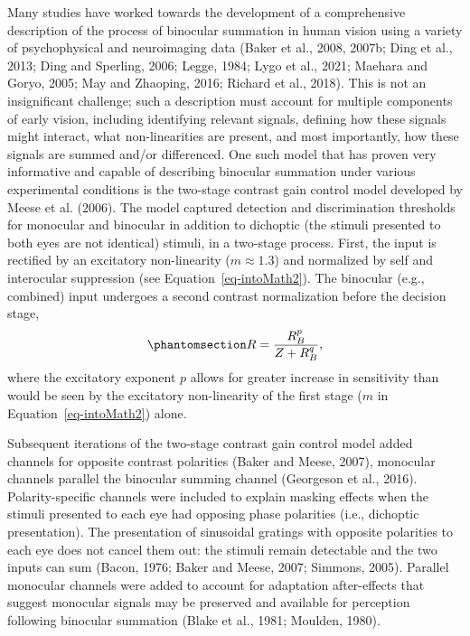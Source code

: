 \documentclass[
  12pt,
]{article}
\begin{document}
Many studies have worked towards the development of a comprehensive
description of the process of binocular summation in human vision using
a variety of psychophysical and neuroimaging data (Baker et al., 2008,
2007b; Ding et al., 2013; Ding and Sperling, 2006; Legge, 1984; Lygo et
al., 2021; Maehara and Goryo, 2005; May and Zhaoping, 2016; Richard et
al., 2018). This is not an insignificant challenge; such a description
must account for multiple components of early vision, including
identifying relevant signals, defining how these signals might interact,
what non-linearities are present, and most importantly, how these
signals are summed and/or differenced. One such model that has proven
very informative and capable of describing binocular summation under
various experimental conditions is the two-stage contrast gain control
model developed by Meese et al. (2006). The model captured detection and
discrimination thresholds for monocular and binocular in addition to
dichoptic (the stimuli presented to both eyes are not identical)
stimuli, in a two-stage process. First, the input is rectified by an
excitatory non-linearity (\(m \approx 1.3\)) and normalized by self and
interocular suppression (see Equation~\ref{eq-intoMath2}). The binocular
(e.g., combined) input undergoes a second contrast normalization before
the decision stage,
\begin{equation}\phantomsection\label{eq-IntroMathSecondStage}{
R = \frac{R_B^p}{Z + R_B^q},
}\end{equation} where the excitatory exponent \(p\) allows for greater
increase in sensitivity than would be seen by the excitatory
non-linearity of the first stage (\(m\) in Equation~\ref{eq-intoMath2})
alone.

Subsequent iterations of the two-stage contrast gain control model added
channels for opposite contrast polarities (Baker and Meese, 2007),
monocular channels parallel the binocular summing channel (Georgeson et
al., 2016). Polarity-specific channels were included to explain masking
effects when the stimuli presented to each eye had opposing phase
polarities (i.e., dichoptic presentation). The presentation of
sinusoidal gratings with opposite polarities to each eye does not cancel
them out: the stimuli remain detectable and the two inputs can sum
(Bacon, 1976; Baker and Meese, 2007; Simmons, 2005). Parallel monocular
channels were added to account for adaptation after-effects that suggest
monocular signals may be preserved and available for perception
following binocular summation (Blake et al., 1981; Moulden, 1980).
\end{document}
